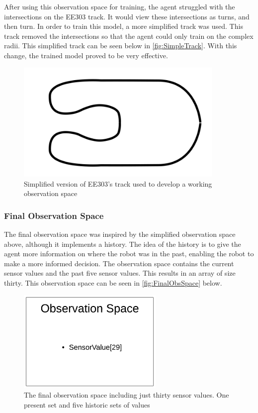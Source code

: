 \documentclass[a4paper,12pt]{article}
\begin{document}
After using this observation space for training, the agent struggled with the intersections on the EE303 track. It would view these intersections as turns, and then turn. In order to train this model, a more simplified track was used. This track removed the intersections so that the agent could only train on the complex radii. This simplified track can be seen below in \autoref{fig:SimpleTrack}. With this change, the trained model proved to be very effective.

\begin{figure}[H]
\centering
\includegraphics[width=10cm]{imgs/SimpleTrack.png}
\caption{Simplified version of EE303's track used to develop a working observation space \cite{KevinMcGuinness}}
\label{fig:SimpleTrack}
\end{figure}

 
\subsubsection{Final Observation Space}

The final observation space was inspired by the simplified observation space above, although it implements a history. The idea of the history is to give the agent more information on where the robot was in the past, enabling the robot to make a more informed decision. The observation space contains the current sensor values and the past five sensor values. This results in an array of size thirty. This observation space can be seen in \autoref{fig:FinalObsSpace} below.

\begin{figure}[H]
\centering
\includegraphics[width=7cm]{imgs/FinalObsSpace.png}
\caption{The final observation space including just thirty sensor values. One present set and five historic sets of values}
\label{fig:FinalObsSpace}
\end{figure}
\end{document}
